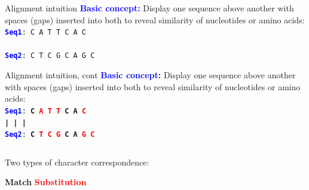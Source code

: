 \documentclass{beamer}
\newcommand{\blu}[1]{\textcolor{blue}{\textbf{#1}}}
\newcommand{\red}[1]{\textcolor{red}{\textbf{#1}}}
\newcommand{\grn}[1]{\textcolor{dark-green}{\textbf{#1}}}
\begin{document}
\begin{frame}{Alignment intuition}
\blu{Basic concept:} Display one sequence above another with spaces (gaps) inserted into both to reveal similarity of nucleotides or amino acids:\\
\bigskip \noindent
\texttt{\blu{Seq1}: C A T T C A C\\
\hspace{3em} \\
\blu{Seq2}: C T C G C A G C
}
\end{frame}

\begin{frame}{Alignment intuition, cont}
\blu{Basic concept:} Display one sequence above another with spaces (gaps) inserted into both to reveal similarity of nucleotides or amino acids:\\
\bigskip \noindent
\texttt{\blu{Seq1}: \grn{C} \red{A T T} \grn{C A} \red{C}\\
\hspace{3em} \grn{|} \hspace{2.5em} \grn{| |} \\
\blu{Seq2}: \grn{C} \red{T C G} \grn{C A} \red{G C}
}\\
\bigskip
\begin{columns}
    \begin{column}{0.5\textwidth}
        Two types of character correspondence:\\
        \begin{outline}
            \1 \grn{Match}
            \1 \red{Substitution}
        \end{outline}
    \end{column}
    \begin{column}{0.5\textwidth}
    \hspace{1em}
    \end{column}
\end{columns}
\end{frame}
\end{document}

